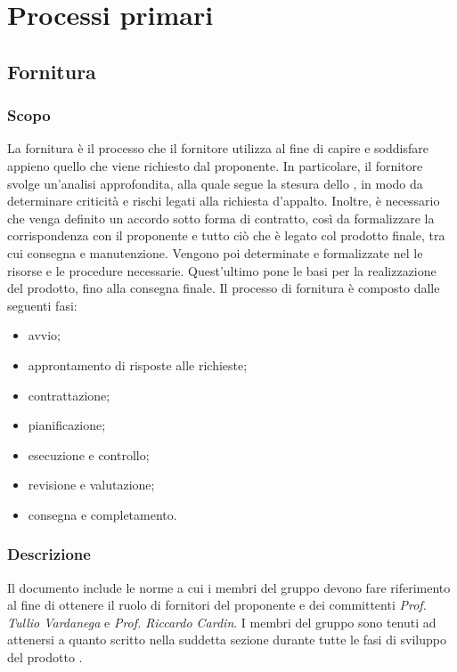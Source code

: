 \section{Processi primari}
\subsection{Fornitura}
\subsubsection{Scopo}
La fornitura è il processo che il fornitore utilizza al fine di capire e soddisfare appieno quello che viene richiesto dal proponente.  In particolare,  il fornitore svolge un'analisi approfondita,  alla quale segue la stesura dello \SdF{}, in modo da determinare criticità e rischi legati alla richiesta d'appalto. Inoltre, è necessario che venga definito un accordo sotto forma di contratto, così da formalizzare la corrispondenza con il proponente e tutto ciò che è legato col prodotto finale, tra cui consegna e manutenzione. Vengono poi determinate e formalizzate nel \PdP{} le risorse e le procedure necessarie. Quest'ultimo pone le basi per la realizzazione del prodotto, fino alla consegna finale.\newline 
Il processo di fornitura è composto dalle seguenti fasi:
\begin{itemize}
	\item avvio;
	\item approntamento di risposte alle richieste;
	\item contrattazione;
	\item pianificazione;
	\item esecuzione e controllo;
	\item revisione e valutazione;
	\item consegna e completamento.
\end{itemize}
\subsubsection{Descrizione}
Il documento include le norme a cui i membri del gruppo \Gruppo{} devono fare riferimento al fine di ottenere il ruolo di fornitori del proponente \proponente{} e dei committenti \textit{Prof. Tullio Vardanega} e \textit{Prof. Riccardo Cardin}. I membri del gruppo sono tenuti ad attenersi a quanto scritto nella suddetta sezione durante tutte le fasi di sviluppo del prodotto \progetto{}.
